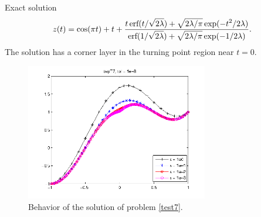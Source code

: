 \documentclass[<options>]{article}
\begin{document}
\textrm{Exact solution}
$$z(t) =  \cos(\pi t) +  t + \frac{ \displaystyle{t \, \textmd{erf}(t / \sqrt{2\lambda}) + \sqrt{2\lambda / \pi} \exp(-t^{2} / 2\lambda)}}
{\displaystyle{\textmd{erf}(1 / \sqrt{2\lambda}) + \sqrt{2\lambda / \pi} \exp(-1 / 2\lambda)}}.$$
The solution has a corner layer in the turning point region near $t =0.$

\begin{figure}[htb]
\centerline{\includegraphics[height=6cm]{Prob7}}
\caption{Behavior of the solution of problem \ref{test7}.}
\end{figure}
\newpage
\end{document}
